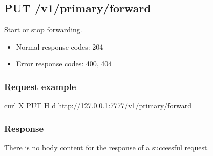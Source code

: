 \documentclass[a4paper,11pt,openany,oneside,english]{sphinxmanual}
\begin{document}
\begin{sphinxVerbatim}[commandchars=\\\{\},formatcom=\footnotesize]
       
       
       
       
  \PYG{p}{]}
   \PYG{p}{[}
       
       
       
  \PYG{p}{]}
\end{sphinxVerbatim}


\subsection{PUT /v1/primary/forward}
\label{\detokenize{api_ref/spp_primary:put-v1-primary-forward}}
Start or stop forwarding.
\begin{itemize}
\item {} 
Normal response codes: 204

\item {} 
Error response codes: 400, 404

\end{itemize}


\subsubsection{Request example}
\label{\detokenize{api_ref/spp_primary:id1}}
\begin{sphinxVerbatim}[commandchars=\\\{\},formatcom=\footnotesize]
 curl \PYGZhy{}X PUT \PYGZhy{}H  \PYGZhy{}d  
  http://127.0.0.1:7777/v1/primary/forward
\end{sphinxVerbatim}


\subsubsection{Response}
\label{\detokenize{api_ref/spp_primary:id2}}
There is no body content for the response of a successful  request.
\end{document}
